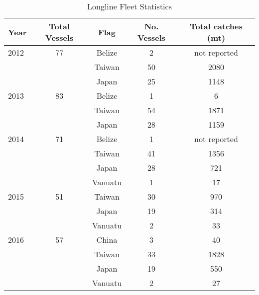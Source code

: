 \begin{table}[htbp] \centering 
	\caption{Longline Fleet Statistics} 
	\label{tab:palau_long} 

\begin{tabular}{l*{4}c}

\hline
\hline
Year	&	Total Vessels	&	Flag	&	No. Vessels	&	Total catches (mt)	\\
\hline		
2012	&	77	&	Belize	&	2	&	not reported	\\
&		&	Taiwan	&	50	&	2080	\\
&		&	Japan	&	25	&	1148	\\							
2013	&	83	&	Belize	&	1	&	6	\\
&		&	Taiwan	&	54	&	1871	\\
&		&	Japan	&	28	&	1159	\\
2014	&	71	&	Belize	&	1	&	not reported	\\
&		&	Taiwan	&	41	&	1356	\\
&		&	Japan	&	28	&	721	\\
&		&	Vanuatu	&	1	&	17	\\
2015	&	51	&	Taiwan	&	30	&	970	\\
&		&	Japan	&	19	&	314	\\
&		&	Vanuatu	&	2	&	33	\\
2016	&	57	&	China	&	3	&	40	\\
&		&	Taiwan	&	33	&	1828	\\
&		&	Japan	&	19	&	550	\\
&		&	Vanuatu	&	2	&	27	\\





\hline 
\hline

\end{tabular} 



\end{table}